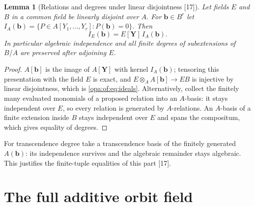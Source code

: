 \documentclass[11pt,oneside]{article}
\numberwithin{equation}{section}
\newtheorem{lemma}[lemma]{Lemma}
\theoremstyle{definition}
\theoremstyle{remark}
\newcommand{\src}[1]{\textup{\textsf{\small[#1]}}}
\begin{document}
\begin{lemma}[Relations and degrees under linear disjointness \src{17}]\label{opa:of:lem:relations}
Let fields $E$ and $B$ in a common field be linearly disjoint over $A$. For $\mathbf b\in B^r$ let
$I_A(\mathbf b)=\{P\in A[Y_1,\dots,Y_r]:P(\mathbf b)=0\}$. Then
\begin{equation}\label{opa:of:eq:ideals}
 I_E(\mathbf b)=E[\mathbf Y]\,I_A(\mathbf b).
\end{equation}
In particular algebraic independence and all finite degrees of subextensions of $B/A$ are preserved after adjoining $E$.
\end{lemma}
\begin{proof}
$A[\mathbf b]$ is the image of $A[\mathbf Y]$ with kernel $I_A(\mathbf b)$; tensoring this presentation with the field $E$ is
exact, and $E\otimes_AA[\mathbf b]\to EB$ is injective by linear disjointness, which is \eqref{opa:of:eq:ideals}.
Alternatively, collect the finitely many evaluated monomials of a proposed relation into an $A$-basis: it stays independent
over $E$, so every relation is generated by $A$-relations. An $A$-basis of a finite extension inside $B$ stays independent
over $E$ and spans the compositum, which gives equality of degrees.
\end{proof}

For transcendence degree take a transcendence basis of the finitely generated $A(\mathbf b)$: its independence survives and
the algebraic remainder stays algebraic. This justifies the finite-tuple equalities of this part \src{17}.

\section{The full additive orbit field}\label{opa:of:sec:additive}
\end{document}
